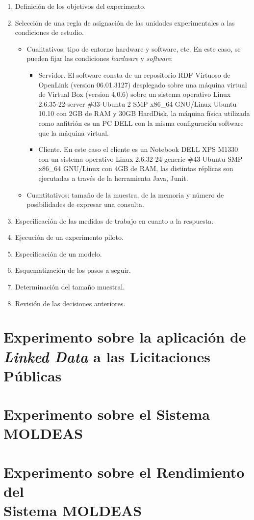 \begin{enumerate}
 \item Definición de los objetivos del experimento. 
\item Selección de una regla de asignación de las unidades experimentales a las condiciones de estudio. 
\begin{itemize}
 \item Cualitativos: tipo de entorno hardware y software, etc. En este caso, se pueden fijar las condiciones \textit{hardware} y \textit{software}:
  \begin{itemize}
  \item Servidor. El software consta de un repositorio \gls{RDF} Virtuoso de OpenLink (version 06.01.3127) desplegado sobre una máquina 
  virtual de Virtual Box (version 4.0.6) sobre un sistema operativo Linux 2.6.35-22-server \#33-Ubuntu 2 SMP x86\_64 GNU/Linux Ubuntu 10.10 con 2GB de RAM y 30GB HardDisk, la 
  máquina física utilizada como anfitrión es un PC DELL con la misma configuración software que la máquina virtual.
  \item Cliente. En este caso el cliente es un Notebook DELL XPS M1330 con un sistema operativo Linux 2.6.32-24-generic \#43-Ubuntu SMP x86\_64 GNU/Linux con 4GB de RAM, las distintas 
  réplicas son ejecutadas a través de la herramienta Java, Junit.
  \end{itemize}
 \item Cuantitativos: tamaño de la muestra, de la memoria y número de posibilidades de expresar una consulta.
\end{itemize}
 \item Especificación de las medidas de trabajo en cuanto a la respuesta.
 \item Ejecución de un experimento piloto. 
 \item Especificación de un modelo.
 \item Esquematización de los pasos a seguir. 
 \item Determinación del tamaño muestral.
 \item Revisión de las decisiones anteriores.
\end{enumerate}


\section{Experimento sobre la aplicación de \textit{Linked Data} a las Licitaciones Públicas}

\section{Experimento sobre el Sistema MOLDEAS}

\section{Experimento sobre el Rendimiento del\\ Sistema MOLDEAS}

